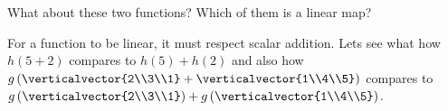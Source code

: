 \documentclass{ximera}
\begin{document}
\begin{question}
\begin{solution}
\begin{multiple-choice}
    \end{multiple-choice}
  \end{solution}

  What about these two functions?  Which of them is a linear map?
  \begin{solution}
 
    \begin{hint}
    	For a function to be linear, it must respect scalar addition.  Lets see what how $h(5+2)$ compares to 
    	$h(5)+h(2)$ and also how $g\left( \verticalvector{2\\3\\1}+\verticalvector{1\\4\\5}\right)$ compares to 
    	$g\left(\verticalvector{2\\3\\1}\right)+g\left( \verticalvector{1\\4\\5}\right)$.
	
        \begin{question}
        	
       
        	

\end{question}
\end{hint}
\end{solution}
\end{question}
\end{document}
